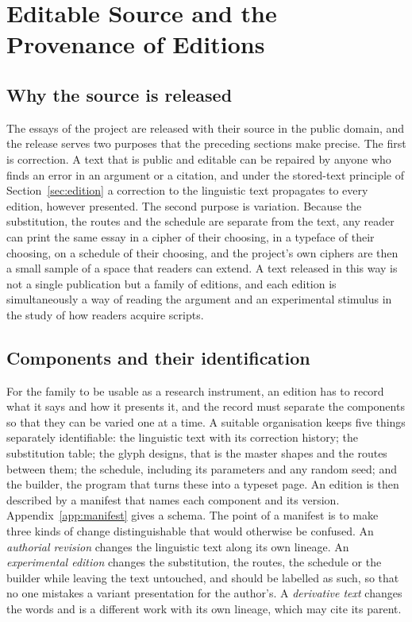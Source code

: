 \section{Editable Source and the Provenance of Editions}\label{sec:source}

\subsection{Why the source is released}

The essays of the project are released with their source in the public domain, and the release serves two purposes that the preceding sections make precise. The first is correction. A text that is public and editable can be repaired by anyone who finds an error in an argument or a citation, and under the stored-text principle of Section~\ref{sec:edition} a correction to the linguistic text propagates to every edition, however presented. The second purpose is variation. Because the substitution, the routes and the schedule are separate from the text, any reader can print the same essay in a cipher of their choosing, in a typeface of their choosing, on a schedule of their choosing, and the project's own ciphers are then a small sample of a space that readers can extend. A text released in this way is not a single publication but a family of editions, and each edition is simultaneously a way of reading the argument and an experimental stimulus in the study of how readers acquire scripts.

\subsection{Components and their identification}

For the family to be usable as a research instrument, an edition has to record what it says and how it presents it, and the record must separate the components so that they can be varied one at a time. A suitable organisation keeps five things separately identifiable: the linguistic text with its correction history; the substitution table; the glyph designs, that is the master shapes and the routes between them; the schedule, including its parameters and any random seed; and the builder, the program that turns these into a typeset page. An edition is then described by a manifest that names each component and its version. Appendix~\ref{app:manifest} gives a schema. The point of a manifest is to make three kinds of change distinguishable that would otherwise be confused. An \emph{authorial revision} changes the linguistic text along its own lineage. An \emph{experimental edition} changes the substitution, the routes, the schedule or the builder while leaving the text untouched, and should be labelled as such, so that no one mistakes a variant presentation for the author's. A \emph{derivative text} changes the words and is a different work with its own lineage, which may cite its parent.

